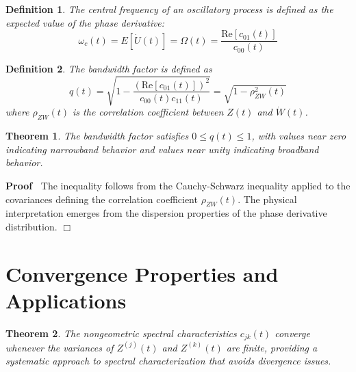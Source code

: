 \documentclass{article}
\newenvironment{proof}{\noindent\textbf{Proof\ }}{\hspace*{\fill}$\Box$\medskip}
\newtheorem{definition}{Definition}
\newtheorem{theorem}{Theorem}
\begin{document}
\begin{definition}
  The central frequency of an oscillatory process is defined as the expected
  value of the phase derivative:
  \begin{equation}
    \omega_c (t) = E [\dot{U} (t)] = \Omega (t) = \frac{\text{Re} [c_{01}
    (t)]}{c_{00} (t)}
  \end{equation}
\end{definition}

\begin{definition}
  The bandwidth factor is defined as
  \begin{equation}
    q (t) = \sqrt{1 - \frac{(\text{Re} [c_{01} (t)])^2}{c_{00} (t) c_{11}
    (t)}} = \sqrt{1 - \rho_{ZW}^2 (t)}
  \end{equation}
  where $\rho_{ZW} (t)$ is the correlation coefficient between $Z (t)$ and
  $\dot{W} (t)$.
\end{definition}

\begin{theorem}
  The bandwidth factor satisfies $0 \leq q (t) \leq 1$, with values near zero
  indicating narrowband behavior and values near unity indicating broadband
  behavior.
\end{theorem}

\begin{proof}
  The inequality follows from the Cauchy-Schwarz inequality applied to the
  covariances defining the correlation coefficient $\rho_{ZW} (t)$. The
  physical interpretation emerges from the dispersion properties of the phase
  derivative distribution.
\end{proof}

\section{Convergence Properties and Applications}

\begin{theorem}
  The nongeometric spectral characteristics $c_{jk} (t)$ converge whenever the
  variances of $Z^{(j)} (t)$ and $Z^{(k)} (t)$ are finite, providing a
  systematic approach to spectral characterization that avoids divergence
  issues.
\end{theorem}
\end{document}
